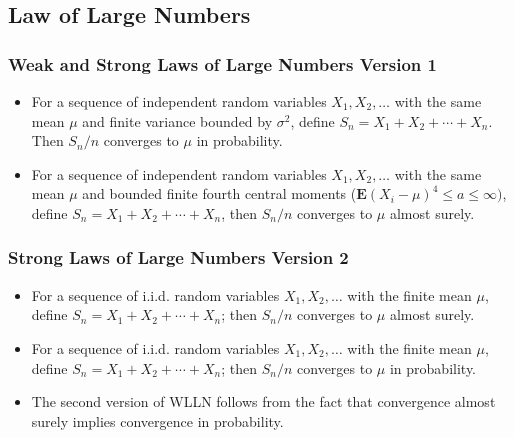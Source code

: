\documentclass[handout]{beamer}
\newcommand{\BE}{\mathbf{E}}
\begin{document}
\subsection{Law of Large Numbers }



\frame
{
  \frametitle{Weak and Strong Laws of Large Numbers Version 1}

   \begin{itemize}
      \item<1->[]\begin{Theorem}[WLLN V1] For a sequence of independent random variables $X_1, X_2,\ldots$ with the same mean $\mu$ and finite variance bounded by $\sigma^2$, define $S_n=X_1+X_2+\cdots +X_n$. Then $S_n/n$ converges to $\mu$ in probability.
      
   \end{Theorem}
      
        \item<1->[]    \begin{Theorem}[SLLN V1] For a sequence of independent random variables $X_1, X_2,\ldots$ with the same mean $\mu$ and bounded finite fourth central moments  ($\BE(X_i-\mu)^4\leq a \leq \infty)$, define $S_n=X_1+X_2+\cdots +X_n$, then $S_n/n$ converges to $\mu$ almost surely.
      
   \end{Theorem}
   
                                      
\end{itemize}
}




\frame
{
  \frametitle{Strong Laws of Large Numbers Version 2}

   \begin{itemize}
   \item<1->[]   \begin{Theorem}[SLLN V2] For a sequence of i.i.d. random variables $X_1, X_2,\ldots$ with the finite mean $\mu$, define $S_n=X_1+X_2+\cdots +X_n$; then $S_n/n$ converges to $\mu$ almost surely.
      
   \end{Theorem}
   
      \item<2->[]   \begin{Corollary}[WLLN V2] For a sequence of i.i.d. random variables $X_1, X_2,\ldots$ with the finite mean $\mu$, define $S_n=X_1+X_2+\cdots +X_n$; then $S_n/n$ converges to $\mu$ in probability.
      
   \end{Corollary}
      
      
      \item<3->[] The second version of WLLN follows from the fact that convergence almost surely implies convergence in probability. 
      
                 
                                      
\end{itemize}
}
\end{document}
